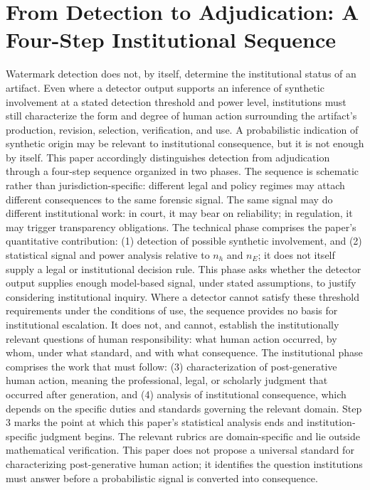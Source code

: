 \documentclass[11pt]{article}
\begin{document}
\section{From Detection to Adjudication: A Four-Step Institutional Sequence}
Watermark detection does not, by itself, determine the institutional status of an
artifact. Even where a detector output supports an inference of synthetic involvement
at a stated detection threshold and power level, institutions must still
characterize the form and degree of human action surrounding the artifact's
production, revision, selection, verification, and use. A probabilistic indication of
synthetic origin may be relevant to institutional consequence, but it is not enough
by itself.
This paper accordingly distinguishes detection from adjudication through a four-step
sequence organized in two phases. The sequence is schematic rather than
jurisdiction-specific: different legal and policy regimes may attach different
consequences to the same forensic signal. The same signal may do different
institutional work: in court, it may bear on reliability; in regulation, it may
trigger transparency obligations.
The technical phase comprises the paper's quantitative contribution: (1) detection of
possible synthetic involvement, and (2) statistical signal and power analysis
relative to $n_h$ and $n_E$; it does not itself supply a legal or institutional
decision rule. This phase asks whether the detector output supplies enough
model-based signal, under stated assumptions, to justify considering institutional
inquiry. Where a detector cannot satisfy these threshold requirements under the
conditions of use, the sequence provides no basis for institutional escalation. It
does not, and cannot, establish the institutionally relevant questions of human
responsibility: what human action occurred, by whom, under what standard, and with
what consequence.
The institutional phase comprises the work that must follow: (3) characterization of
post-generative human action, meaning the professional, legal, or scholarly judgment
that occurred after generation, and (4) analysis of institutional consequence, which
depends on the specific duties and standards governing the relevant domain.
Step 3 marks the point at which this paper's statistical analysis ends and
institution-specific judgment begins. The relevant rubrics are domain-specific and
lie outside mathematical verification. This paper does not propose a universal
standard for characterizing post-generative human action; it identifies the question
institutions must answer before a probabilistic signal is converted into consequence.
\end{document}
